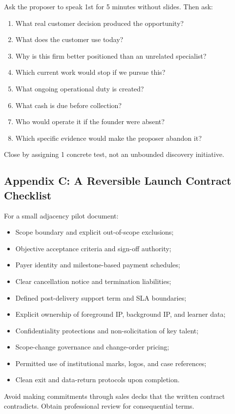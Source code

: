 Ask the proposer to speak 1st for 5 minutes without slides. Then ask:
\begin{enumerate}
    \item What real customer decision produced the opportunity?
    \item What does the customer use today?
    \item Why is this firm better positioned than an unrelated specialist?
    \item Which current work would stop if we pursue this?
    \item What ongoing operational duty is created?
    \item What cash is due before collection?
    \item Who would operate it if the founder were absent?
    \item Which specific evidence would make the proposer abandon it?
\end{enumerate}
Close by assigning 1 concrete test, not an unbounded discovery initiative.

\subsection*{Appendix C: A Reversible Launch Contract Checklist}
\label{sec:appendix_c_reversible_launch_contract}

For a small adjacency pilot document:
\begin{itemize}
    \item Scope boundary and explicit out-of-scope exclusions;
    \item Objective acceptance criteria and sign-off authority;
    \item Payer identity and milestone-based payment schedules;
    \item Clear cancellation notice and termination liabilities;
    \item Defined post-delivery support term and SLA boundaries;
    \item Explicit ownership of foreground IP, background IP, and learner data;
    \item Confidentiality protections and non-solicitation of key talent;
    \item Scope-change governance and change-order pricing;
    \item Permitted use of institutional marks, logos, and case references;
    \item Clean exit and data-return protocols upon completion.
\end{itemize}
Avoid making commitments through sales decks that the written contract contradicts. Obtain professional review for consequential terms.


